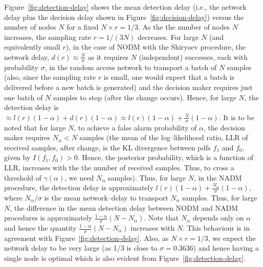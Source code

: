 \documentclass[acmtosn]{acmtrans2m}
\begin{document}
Figure~\ref{fig:detection-delay} shows the mean detection delay (i.e., the network 
delay plus the decision delay shown in Figure~\ref{fig:decision-delay}) versus the 
number of nodes $N$ for a fixed $N \times r = 1/3$. As the the number of nodes $N$ 
increases, the sampling rate $r = 1/(3N)$ decreases. For large $N$ (and equivalently 
small $r$), in the case of {\sf NODM} with the Shiryaev procedure, the network delay, 
$d(r) \approx \frac{N}{\sigma}$ as it requires $N$ (independent) successes, each with 
probability $\sigma$, in the random access network to transport a batch of $N$ samples 
(also, since the sampling rate $r$ is small, one would expect that a batch is delivered 
before a new batch is generated) and the decision maker requires just one batch of $N$ 
samples to stop (after the change occurs). Hence, for large $N$, the detection delay is 
$\approx l(r)(1-\alpha) + d(r)(1-\alpha) \approx l(r) (1-\alpha)+ \frac{N}{\sigma}(1-\alpha)$.
It is to be noted that for large $N$, to achieve a false 
alarm probability of $\alpha$, the decision maker requires $N_{\alpha} < N$ samples
(the mean of the log--likelihood ratio, LLR of received samples, after change, is the 
KL divergence between pdfs $f_1$ and $f_0$, given by $I(f_1,f_0) > 0$.
Hence, the posterior probability, which is a function of LLR, increases with the the number of received samples. Thus, 
to cross a threshold of $\gamma(\alpha)$, we need $N_\alpha$ samples). Thus, for large 
$N$, in the {\sf NADM} procedure, the detection delay is approximately 
$l(r)(1-\alpha) + \frac{N_\alpha}{\sigma}(1-\alpha)$, where $N_\alpha/\sigma$ is the mean 
network--delay to transport $N_\alpha$ samples. Thus, for large $N$, the 
difference in the mean detection 
delay between {\sf NODM} and {\sf NADM} procedures is approximately 
$\frac{1 - \alpha}{\sigma}(N-N_\alpha)$. Note that $N_\alpha$ depends only on $\alpha$ 
and hence the quantity $\frac{1 - \alpha}{\sigma}(N-N_\alpha)$ increases with $N$. This 
behaviour is in agreement with Figure~\ref{fig:detection-delay}. Also, as 
$N \times r = 1/3$, we expect the network delay to be very large (as 1/3 is close to 
$\sigma = 0.3636$) and hence having a single node is optimal which is also evident from 
Figure~\ref{fig:detection-delay}. 
\end{document}
